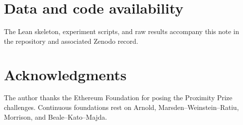 \documentclass[11pt,a4paper]{article}
\begin{document}
\section*{Data and code availability}
The Lean skeleton, experiment scripts, and raw results accompany this note in the repository and associated Zenodo record.

\section*{Acknowledgments}
The author thanks the Ethereum Foundation for posing the Proximity Prize challenges. Continuous foundations rest on Arnold, Marsden--Weinstein--Ratiu, Morrison, and Beale--Kato--Majda.
\end{document}
